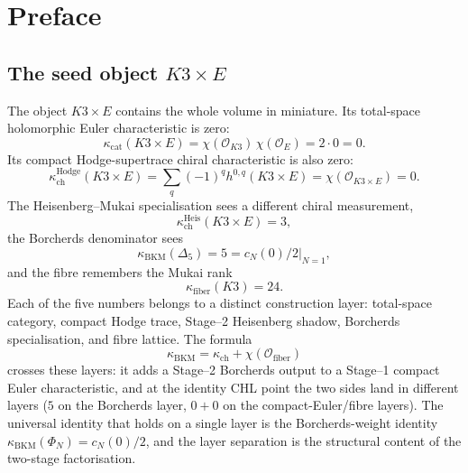 \chapter*{Preface}

\providecommand{\kBKM}{\kappa_{\mathrm{BKM}}}
\providecommand{\kch}{\kappa_{\mathrm{ch}}}
\providecommand{\kcat}{\kappa_{\mathrm{cat}}}
\providecommand{\kfib}{\kappa_{\mathrm{fiber}}}
\providecommand{\CYcat}{\mathrm{CY}\text{-cat}}
\providecommand{\ChirAlg}{\mathrm{ChirAlg}}
\providecommand{\HolFA}{\mathrm{HolFA}}
\providecommand{\hCS}{\mathrm{hCS}}
\providecommand{\SpCh}{\mathrm{Sp}^{\mathrm{ch}}}
\providecommand{\PhiFA}{\Phi^{\mathrm{FA}}}
\providecommand{\cO}{\mathcal{O}}
\providecommand{\cM}{\mathcal{M}}
\providecommand{\fg}{\mathfrak{g}}
\providecommand{\CoHA}{\mathrm{CoHA}}
\providecommand{\Meff}{\mathcal{M}^{+}_{\mathrm{eff}}}
\providecommand{\CC}{\mathbb{C}}

\section*{The seed object \texorpdfstring{$K3\times E$}{K3 x E}}
\label{sec:preface-k3xe-seed}

The object \(K3\times E\) contains the whole volume in miniature. Its
total-space holomorphic Euler characteristic is zero:
\[
\kcat(K3\times E)
=
\chi(\cO_{K3})\,\chi(\cO_E)
=
2\cdot 0
=0.
\]
Its compact Hodge-supertrace chiral characteristic is also zero:
\[
\kappa_{\mathrm{ch}}^{\mathrm{Hodge}}(K3\times E)
=
\sum_q(-1)^q h^{0,q}(K3\times E)
=
\chi(\cO_{K3\times E})
=0.
\]
The Heisenberg--Mukai specialisation sees a different chiral
measurement,
\[
\kappa_{\mathrm{ch}}^{\mathrm{Heis}}(K3\times E)=3,
\]
the Borcherds denominator sees
\[
\kBKM(\Delta_5)=5=c_N(0)/2\big|_{N=1},
\]
and the fibre remembers the Mukai rank
\[
\kfib(K3)=24.
\]
Each of the five numbers belongs to a distinct construction layer:
total-space category, compact Hodge trace, Stage--2 Heisenberg
shadow, Borcherds specialisation, and fibre lattice. The formula
\[
\kBKM
=
\kch+\chi(\cO_{\mathrm{fiber}})
\]
crosses these layers: it adds a Stage--2 Borcherds output to a
Stage--1 compact Euler characteristic, and at the identity CHL point
the two sides land in different layers ($5$ on the Borcherds layer,
$0+0$ on the compact-Euler/fibre layers). The universal identity that
holds on a single layer is the Borcherds-weight identity
$\kBKM(\Phi_N) = c_N(0)/2$, and the layer separation is the structural
content of the two-stage factorisation.

